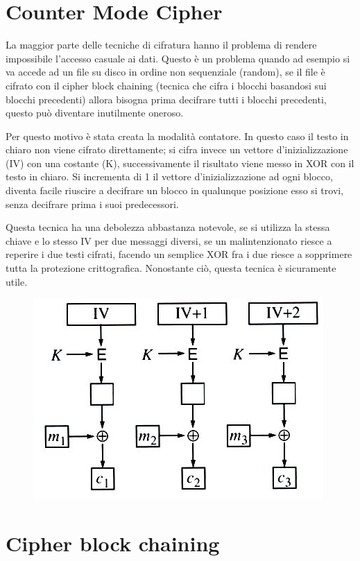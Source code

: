 \section{Counter Mode Cipher}

La maggior parte delle tecniche di cifratura hanno il problema di rendere impossibile l’accesso casuale ai dati. Questo è un problema quando ad esempio si va accede ad un file su disco in ordine non sequenziale (random), se il file è cifrato con il cipher block chaining (tecnica che cifra i blocchi basandosi sui blocchi precedenti) allora bisogna prima decifrare tutti i blocchi precedenti, questo può diventare inutilmente oneroso.

Per questo motivo è stata creata la modalità contatore. In questo caso il testo in chiaro non viene cifrato direttamente; si cifra invece un vettore d’inizializzazione (IV) con una costante (K), successivamente il risultato viene messo in XOR con il testo in chiaro. Si incrementa di 1 il vettore d’inizializzazione ad ogni blocco, diventa facile riuscire a decifrare un blocco in qualunque posizione esso si trovi, senza decifrare prima i suoi predecessori.

Questa tecnica ha una debolezza abbastanza notevole, se si utilizza la stessa chiave e lo stesso IV per due messaggi diversi, se un malintenzionato riesce a reperire i due testi cifrati, facendo un semplice XOR fra i due riesce a sopprimere tutta la protezione crittografica.
Nonostante ciò, questa tecnica è sicuramente utile.

\begin{figure}[H]
\centering
\includegraphics[scale=0.6]{res/img/54_CMC.png}
\end{figure}
 
\section{Cipher block chaining}

